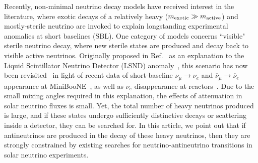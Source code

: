 \documentclass[
reprint,
superscriptaddress,
showpacs,
preprintnumbers,
nofootinbib,
nobibnotes,
amsmath,
amssymb, 
aps,
prd,
floatfix
]{revtex4-1}
\begin{document}
Recently, non-minimal neutrino decay models have received interest in the literature, where exotic decays of a relatively heavy ($m_{\rm exotic} \gg m_{\rm active}$) and mostly-sterile neutrino are invoked to explain longstanding experimental anomalies at short baselines (SBL). One category of models concerns ``visible" sterile neutrino decay, where new sterile states are produced and decay back to visible active neutrinos. Originally proposed in Ref.~\cite{PalomaresRuiz:2005vf} as an explanation to the Liquid Scintillator Neutrino Detector (LSND) anomaly~\cite{Athanassopoulos:1996jb,Aguilar:2001ty}, this scenario has now been revisited~\cite{deGouvea:2019qre,Dentler:2019dhz} in light of recent data of short-baseline $\nu_\mu \to \nu_e$ and $\overline{\nu}_\mu \to \overline{\nu}_e$ appearance at MiniBooNE~\cite{AguilarArevalo:2007it,Aguilar-Arevalo:2018gpe,Aguilar-Arevalo:2020nvw}, as well as $\nu_e$ disappearance at reactors~\cite{Mention:2011rk,Dentler:2017tkw}. Due to the small mixing angles required in this explanation, the effects of attenuation in solar neutrino fluxes is small. Yet, the total number of heavy neutrinos produced is large, and if these states undergo sufficiently distinctive decays or scattering inside a detector, they can be searched for. In this article, we point out that if antineutrinos are produced in the decay of these heavy neutrinos, then they are strongly constrained by existing searches for neutrino-antineutrino transitions in solar neutrino experiments. 
\end{document}
